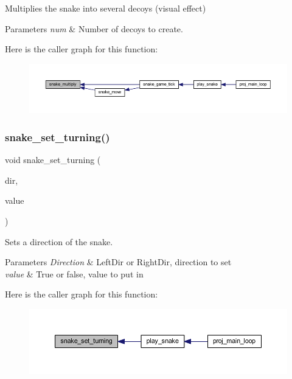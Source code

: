 Multiplies the snake into several decoys (visual effect) 


\begin{DoxyParams}{Parameters}
{\em num} & Number of decoys to create. \\
\hline
\end{DoxyParams}
Here is the caller graph for this function\+:\nopagebreak
\begin{figure}[H]
\begin{center}
\leavevmode
\includegraphics[width=350pt]{group__snake_ga93a5f80b4aa83b0651e9eaa99576140d_icgraph}
\end{center}
\end{figure}
\mbox{\label{group__snake_ga0b5ae42db7d2fc61358217de9c031c5a}} 
\subsubsection{\texorpdfstring{snake\+\_\+set\+\_\+turning()}{snake\_set\_turning()}}
{\footnotesize\ttfamily void snake\+\_\+set\+\_\+turning (\begin{DoxyParamCaption}\item[{enum \mbox{\hyperlink{group__snake_ga224b9163917ac32fc95a60d8c1eec3aa}{Direction}}}]{dir,  }\item[{bool}]{value }\end{DoxyParamCaption})}



Sets a direction of the snake. 


\begin{DoxyParams}{Parameters}
{\em Direction} & Left\+Dir or Right\+Dir, direction to set \\
\hline
{\em value} & True or false, value to put in \\
\hline
\end{DoxyParams}
Here is the caller graph for this function\+:\nopagebreak
\begin{figure}[H]
\begin{center}
\leavevmode
\includegraphics[width=350pt]{group__snake_ga0b5ae42db7d2fc61358217de9c031c5a_icgraph}
\end{center}
\end{figure}
\mbox{\label{group__snake_ga856dc5c649341abaee91d35bafaa92b9}} 
